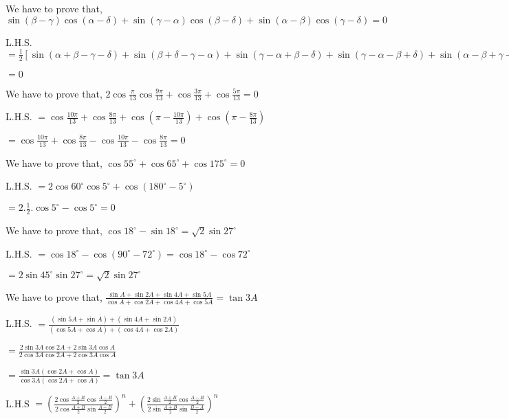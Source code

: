 \item We have to prove that, $\sin(\beta - \gamma)\cos(\alpha - \delta) + \sin(\gamma - \alpha)\cos(\beta - \delta) +
  \sin(\alpha - \beta)\cos(\gamma - \delta) = 0$

  L.H.S. $= \frac{1}{2}[\sin(\alpha + \beta - \gamma - \delta) + \sin(\beta + \delta - \gamma - \alpha) + \sin(\gamma
    -\alpha + \beta - \delta) + \sin(\gamma - \alpha - \beta + \delta) + \sin(\alpha - \beta + \gamma - \delta) - \sin(\alpha -
    \beta - \gamma + \delta)]$

  $= 0$

\item We have to prove that, $2\cos\frac{\pi}{13}\cos \frac{9\pi}{13} + \cos \frac{3\pi}{13} + \cos \frac{5\pi}{13} = 0$

  L.H.S. $=\cos \frac{10\pi}{13} + \cos \frac{8\pi}{13} + \cos \left(\pi - \frac{10\pi}{13}\right) + \cos \left(\pi -
  \frac{8\pi}{13}\right)$

  $= \cos \frac{10\pi}{13} + \cos \frac{8\pi}{13} - \cos \frac{10\pi}{13} - \cos \frac{8\pi}{13} = 0$

\item We have to prove that, $\cos 55^\circ + \cos65^\circ + \cos 175^\circ = 0$

  L.H.S. $= 2\cos 60^\circ\cos5^\circ + \cos(180^\circ - 5^\circ)$

  $= 2.\frac{1}{2}.\cos5^\circ - \cos 5^\circ = 0$

\item We have to prove that, $\cos 18^\circ -\sin 18^\circ = \sqrt{2}\sin 27^\circ$

  L.H.S. $= \cos18^\circ - \cos(90^\circ - 72^\circ) = \cos 18^\circ - \cos 72^\circ$

  $= 2\sin 45^\circ\sin 27^\circ = \sqrt{2}\sin27^\circ$

\item We have to prove that, $\frac{\sin A + \sin 2A + \sin 4A + \sin 5A}{\cos A + \cos 2A + \cos 4A + \cos 5A} = \tan 3A$

  L.H.S. $= \frac{(\sin 5A + \sin A) + (\sin 4A + \sin 2A)}{(\cos 5A + \cos A) + (\cos 4A + \cos 2A)}$

  $= \frac{2\sin 3A\cos 2A + 2\sin 3A\cos A}{2\cos3A\cos2A + 2\cos 3A\cos A}$

  $= \frac{\sin 3A(\cos 2A + \cos A)}{\cos 3A(\cos 2A + \cos A)} = \tan 3A$

\item L.H.S $= \left(\frac{2\cos \frac{A + B}{2}\cos \frac{A - B}{2}}{2\cos\frac{A + B}{2}\sin\frac{A - B}{2}}\right)^n +
  \left(\frac{2\sin\frac{A + B}{2}\cos\frac{A - B}{2}}{2\sin\frac{A + B}{2}\sin\frac{B - A}{2}}\right)^n$

